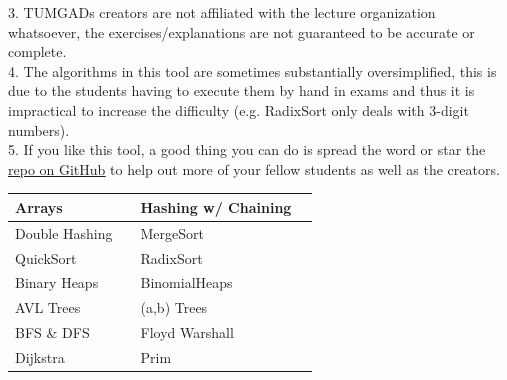 \documentclass[12pt]{article}
\begin{document}
    3. TUMGADs creators are not affiliated with the lecture organization whatsoever, the exercises/explanations are not
    guaranteed to be accurate or complete.
    \\[0.2in]
    4. The algorithms in this tool are sometimes substantially oversimplified, this is due to the students having to execute them by hand in exams
    and thus it is impractical to increase the difficulty (e.g. RadixSort only deals with 3-digit numbers).
    \\[0.2in]
    5. If you like this tool, a good thing you can do is spread the word or star the \href{https://github.com/SebastianOner/TUMGAD/}{\underline{repo on GitHub}} to help out more of your fellow students as well as the creators.
    \vspace{20px}
    \begin{center}
        \begin{tabular}{|P{4cm}|P{1cm}||P{4cm}|P{1cm}|}
            \hline
            Arrays & %
            & Hashing w/ Chaining & %
            \\ \hline
            Double Hashing & %
            & MergeSort & %
            \\ \hline
            QuickSort & %
            & RadixSort & %
            \\ \hline
            Binary Heaps & %
            & BinomialHeaps & %
            \\ \hline
            AVL Trees & %
            & (a,b) Trees & %
            \\ \hline
            BFS \& DFS & %
            & Floyd Warshall & %
            \\ \hline
            Dijkstra & %
            & Prim & %
            \\ \hline
        \end{tabular}
    \end{center}
\end{document}
